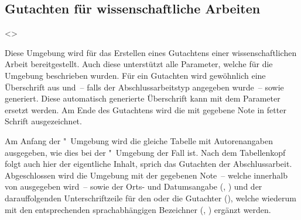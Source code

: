 \begin{DeclareEntity}{}
\section{%
  Gutachten für wissenschaftliche Arbeiten%
}

\begin{Declaration}
  {}
  <>
\begin{Declaration}
  {}
\begin{Declaration}
  {}
\printdeclarationlist

Diese Umgebung wird für das Erstellen eines Gutachtens einer wissenschaftlichen 
Arbeit bereitgestellt. Auch diese unterstützt alle Parameter, welche für die 
Umgebung  beschrieben wurden. Für ein Gutachten wird 
gewöhnlich eine Überschrift aus  und~-- falls der 
Abschlussarbeitstyp angegeben wurde~--  sowie 
 generiert. Diese automatisch generierte Überschrift kann mit dem 
Parameter  ersetzt werden. Am Ende des 
Gutachtens wird die mit  gegebene Note in fetter 
Schrift ausgezeichnet.

Am Anfang der "~Umgebung wird die gleiche Tabelle mit 
Autorenangaben ausgegeben, wie dies bei der "~Umgebung der 
Fall ist. Nach dem Tabellenkopf folgt auch hier der eigentliche Inhalt, sprich 
das Gutachten der Abschlussarbeit. Abgeschlossen wird die Umgebung mit der 
gegebenen Note~-- welche innerhalb von  ausgegeben wird~-- 
sowie der Orts- und Datumsangabe (, ) und der 
darauffolgenden Unterschriftzeile für den oder die Gutachter (), 
welche wiederum mit den entsprechenden sprachabhängigen Bezeichner 
(, ) ergänzt werden.
\end{Declaration}
\end{Declaration}
\end{Declaration}

\begin{Declaration}
  {}
\printdeclarationlist


\end{Declaration}
\end{DeclareEntity}
